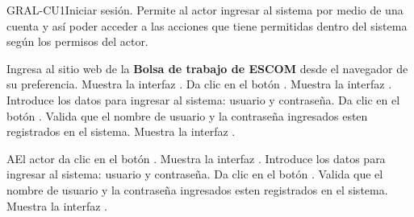 
\begin{UseCase}[]{GRAL-CU1}{Iniciar sesión.}{
	Permite al actor ingresar al sistema por medio de una cuenta y así poder acceder a las
	acciones que tiene permitidas dentro del sistema según los permisos del actor.
}
\end{UseCase}

\begin{UCtrayectoria}
	\UCpaso [\UCactor] Ingresa al sitio web de la \textbf{Bolsa de trabajo de ESCOM} desde el navegador de su preferencia.
    \UCpaso [\UCsist] Muestra la interfaz .
	\UCpaso [\UCactor] Da clic en el botón . 
	\UCpaso [\UCsist] Muestra la interfaz .
	\UCpaso [\UCactor] Introduce los datos para ingresar al sistema: usuario y contraseña.\label{gral-01-1}
	\UCpaso [\UCactor] Da clic en el botón . 
    \UCpaso [\UCsist] Valida que el nombre de usuario y la contraseña ingresados esten registrados en el sistema.
    \UCpaso [\UCsist] Muestra la interfaz .
\end{UCtrayectoria}

\begin{UCtrayectoriaA}{A}{El actor da clic en el botón .}
	\UCpaso [\UCsist] Muestra la interfaz .
	\UCpaso [\UCactor] Introduce los datos para ingresar al sistema: usuario y contraseña.\label{gral-01-2}
	\UCpaso [\UCactor] Da clic en el botón . 
    \UCpaso [\UCsist] Valida que el nombre de usuario y la contraseña ingresados esten registrados en el sistema. 
    \UCpaso [\UCsist] Muestra la interfaz .
\end{UCtrayectoriaA} 

